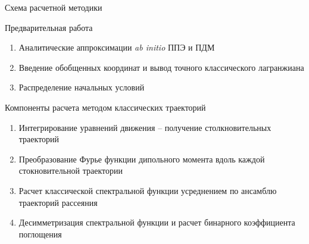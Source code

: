 \documentclass[10pt,usenames,pdf,hyperref={unicode},dvipsnames]{beamer}
\begin{document}
\begin{frame}{Схема расчетной методики}
    \vspace*{-0.5cm}
    \begin{block}{Предварительная работа}
        \begin{enumerate}
            \item Аналитические аппроксимации \textit{ab initio} ППЭ и ПДМ
            \item Введение обобщенных координат и вывод точного классического лагранжиана
            \item Распределение начальных условий
        \end{enumerate}
    \end{block}
    \vspace*{-0.3cm}
    \begin{block}{Компоненты расчета методом классических траекторий}
        \begin{enumerate}
        \item Интегрирование уравнений движения -- получение столкновительных траекторий
        \item Преобразование Фурье функции дипольного момента вдоль каждой стокновительной траектории
        \item Расчет классической спектральной функции усреднением по ансамблю траекторий рассеяния 
        \item Десимметризация спектральной функции и расчет бинарного коэффициента поглощения
        \end{enumerate}
    \end{block}
\end{frame}
\end{document}
